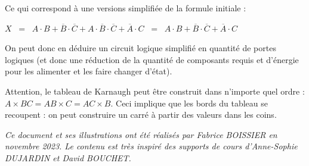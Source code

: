 \documentclass[11pt,a4paper]{article}
\begin{document}
Ce qui correspond à une versions simplifiée de la formule initiale :

\begin{center}
$ X \; \; = \; \; A \cdot B + \overline{B} \cdot \overline{C} + A \cdot \overline{B} \cdot \overline{C} + \overline{A} \cdot C \; \; = \; \; A \cdot B + \overline{B} \cdot \overline{C} + \overline{A} \cdot C $
\end{center}

\medskip

On peut donc en déduire un circuit logique simplifié en quantité de portes logiques (et donc une réduction de la quantité de composants requis et d'énergie pour les alimenter et les faire changer d'état).


\bigskip


Attention, le tableau de Karnaugh peut être construit dans n'importe quel ordre : $ A \times BC = AB \times C = AC \times B $.
Ceci implique que les \og bords \fg{} du tableau se recoupent : on peut construire un carré à partir des valeurs dans les coins.





\bigskip

\vfillFirst

\vfillLast


\begin{center}
\textit{Ce document et ses illustrations ont été réalisés par Fabrice BOISSIER en novembre 2023. \newline
Le contenu est très inspiré des supports de cours d'Anne-Sophie DUJARDIN et David BOUCHET.}

\end{center}
\end{document}
